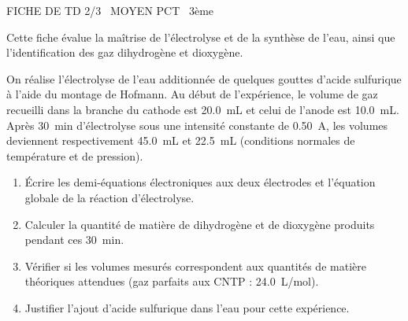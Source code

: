 \documentclass[11pt]{article}
\begin{document}
\begin{tcolorbox}[enhanced,colback=popink,colframe=popink,arc=10pt,boxrule=0pt,left=12pt,right=12pt,top=9pt,bottom=9pt]
{\color{white}\popxbold\small FICHE DE TD 2/3 \textbullet\ MOYEN \hfill PCT \textbullet\ 3ème\par}
\end{tcolorbox}
\vspace{4pt}
Cette fiche évalue la maîtrise de l'électrolyse et de la synthèse de l'eau, ainsi que l'identification des gaz dihydrogène et dioxygène.

\begin{exercice}
On réalise l'électrolyse de l'eau additionnée de quelques gouttes d'acide sulfurique à l'aide du montage de Hofmann. Au début de l'expérience, le volume de gaz recueilli dans la branche du cathode est \SI{20,0}{mL} et celui de l'anode est \SI{10,0}{mL}. Après \SI{30}{min} d'électrolyse sous une intensité constante de \SI{0,50}{A}, les volumes deviennent respectivement \SI{45,0}{mL} et \SI{22,5}{mL} (conditions normales de température et de pression).
\begin{enumerate}
    \item Écrire les demi-équations électroniques aux deux électrodes et l'équation globale de la réaction d'électrolyse.
    \item Calculer la quantité de matière de dihydrogène et de dioxygène produits pendant ces \SI{30}{min}.
    \item Vérifier si les volumes mesurés correspondent aux quantités de matière théoriques attendues (gaz parfaits aux CNTP : \SI{24,0}{L/mol}).
    \item Justifier l'ajout d'acide sulfurique dans l'eau pour cette expérience.
\end{enumerate}
\end{exercice}
\end{document}
